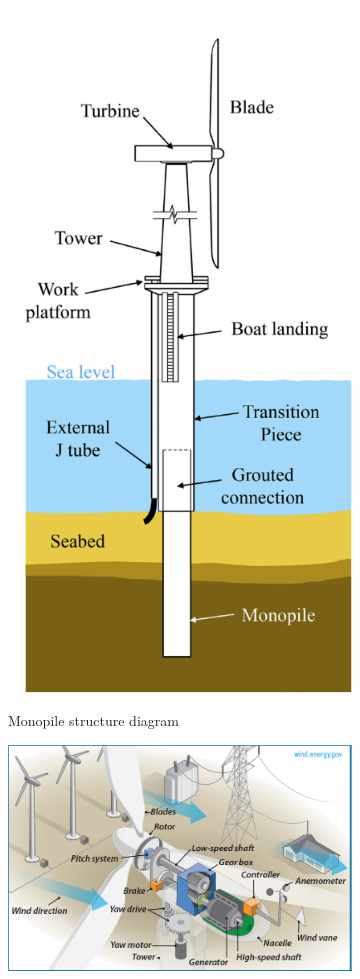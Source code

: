\begin{figure}
    \centering
    \begin{subfigure}[b]{0.3\textwidth}
        \centering
        \includegraphics[width=0.7\linewidth]{./part1/figures/owt_diagram.pdf}
        \label{fig:struc_components}
        \caption{Monopile structure diagram}
    \end{subfigure}
    \begin{subfigure}[b]{0.48\textwidth}
        \centering
        \includegraphics[width=\linewidth]{./part1/figures/nacelle_components.png}

\end{subfigure}
\end{figure}
